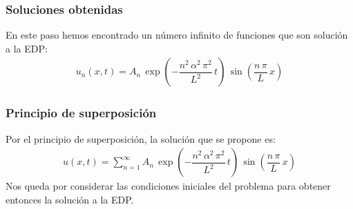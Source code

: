 \begin{frame}
\frametitle{Soluciones obtenidas}
En este paso hemos encontrado un número infinito de funciones que son solución a la EDP:
\begin{align}
u_{n} (x, t) = A_{n} \, \exp \left( - \dfrac{n^{2} \, \alpha^{2} \, \pi^{2}}{L^{2}} \, t \right) \, \sin \left( \dfrac{n \, \pi}{L} \, x \right)
\label{eq:ecuacion_06_02_37}    
\end{align}
\end{frame}
\begin{frame}
\frametitle{Principio de superposición}
Por el principio de superposición, la solución que se propone es:
\begin{align}
u (x, t) = \sum_{n=1}^{\infty} A_{n} \, \exp \left( - \dfrac{n^{2} \, \alpha^{2} \, \pi^{2}}{L^{2}} \, t \right) \, \sin \left( \dfrac{n \, \pi}{L} \, x \right)
\label{eq:ecuacion_06_02_38}
\end{align}
Nos queda por considerar las condiciones iniciales del problema para obtener entonces la solución a la EDP.
\end{frame}
